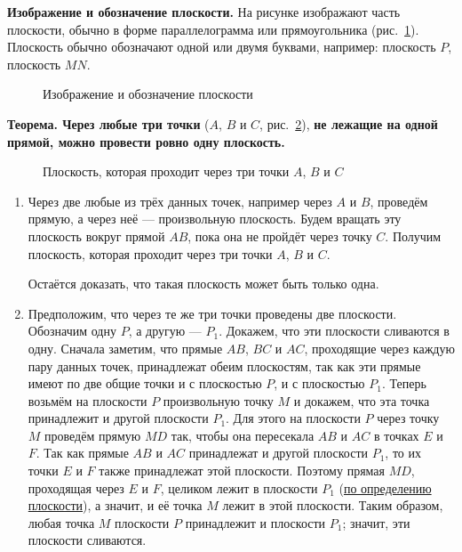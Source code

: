  \textbf{Изображение и обозначение плоскости.} На рисунке изображают часть плоскости, обычно в форме параллелограмма или прямоугольника (рис.~\ref{fig:kiselev-stereo-301}). Плоскость обычно обозначают одной или двумя буквами, например: плоскость \(P\), плоскость \(MN\).

\begin{figure}[htbp]
    \centering
    \renewcommand{\thefigure}{301}
    \captionsetup{name=Рис.,labelsep=period}
    
    \caption{Изображение и обозначение плоскости}\label{fig:kiselev-stereo-301}
\end{figure}

 \textbf{Теорема. Через любые три точки} (\(A\), \(B\) и \(C\), рис.~\ref{fig:kiselev-stereo-302}), \textbf{не лежащие на одной прямой, можно провести ровно одну плоскость.}

\begin{figure}[htbp]
    \centering
    \renewcommand{\thefigure}{302}
    \captionsetup{name=Рис.,labelsep=period}
    
    \caption{Плоскость, которая проходит через три точки \(A\), \(B\) и \(C\)}\label{fig:kiselev-stereo-302}
\end{figure}

\begin{enumerate}[label=\arabic*)]
    \item Через две любые из трёх данных точек, например через \(A\) и \(B\), проведём прямую, а через неё --- произвольную плоскость. Будем вращать эту плоскость вокруг прямой \(AB\), пока она не пройдёт через точку \(C\). Получим плоскость, которая проходит через три точки \(A\), \(B\) и \(C\).

    Остаётся доказать, что такая плоскость может быть только одна.

    \item Предположим, что через те же три точки проведены две плоскости. Обозначим одну \(P\), а другую --- \(P_1\).
    Докажем, что эти плоскости сливаются в одну. Сначала заметим, что прямые \(AB\), \(BC\) и \(AC\), проходящие через каждую пару данных точек, принадлежат обеим плоскостям, так как эти прямые имеют по две общие точки и с плоскостью \(P\), и с плоскостью \(P_1\). Теперь возьмём на плоскости \(P\) произвольную точку \(M\) и докажем, что эта точка принадлежит и другой плоскости \(P_1\). Для этого на плоскости \(P\) через точку \(M\) проведём прямую \(MD\) так, чтобы она пересекала \(AB\) и \(AC\) в точках \(E\) и \(F\). Так как прямые \(AB\) и \(AC\) принадлежат и другой плоскости \(P_1\), то их точки \(E\) и \(F\) также принадлежат этой плоскости. Поэтому прямая \(MD\), проходящая через \(E\) и \(F\), целиком лежит в плоскости \(P_1\) (\hyperref[para:plane-definition]{по определению плоскости}), а значит, и её точка \(M\) лежит в этой плоскости. Таким образом, любая точка \(M\) плоскости \(P\) принадлежит и плоскости \(P_1\); значит, эти плоскости сливаются.
\end{enumerate}


